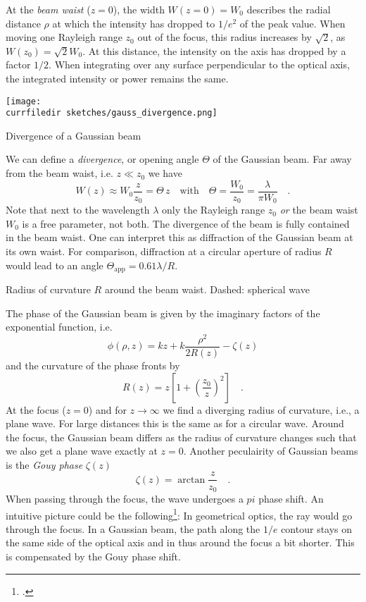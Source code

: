 At the \emph{beam waist} ($z=0$), the width $W(z=0) = W_0$ describes the radial distance $\rho$ at which the intensity  has dropped to $1/e^2$ of the peak value. When moving one Rayleigh range $z_0$ out of the focus, this radius increases by $\sqrt{2}$, as $W(z_0) = \sqrt{2} W_0$. At this distance, the intensity on the axis has dropped by a factor $1/2$. When integrating over any surface perpendicular to the optical axis, the integrated intensity or power remains the same.

\begin{marginfigure}
    \texttt{[image: \\currfiledir sketches/gauss\_divergence.png]}
   \caption{Divergence of a Gaussian beam}
\end{marginfigure}


We can define a \emph{divergence}, or opening angle $\Theta$ of the Gaussian beam. Far away from the beam waist, i.e. $z \ll z_0$ we have
\begin{equation}
    W(z) \approx W_0 \frac{z}{z_0} = \Theta \, z \quad \text{with} \quad \Theta = \frac{W_0}{z_0} = \frac{\lambda}{\pi W_0} \quad .
 \end{equation}
 Note that next to the wavelength $\lambda$ only the Rayleigh range $z_0$ \emph{or} the beam waist $W_0$ is a free parameter, not both. The divergence of the beam is fully contained in the beam waist. One can interpret this as diffraction of the Gaussian beam at its own waist. For comparison, diffraction at a circular aperture of radius $R$ would  lead to an angle $\Theta_\text{app} = 0.61 \lambda  / R$.


\begin{marginfigure}
   \caption{Radius of curvature $R$ around the beam waist. Dashed: spherical wave}
\end{marginfigure}


The phase of the Gaussian beam is given by the imaginary factors of the exponential function, i.e.
\begin{equation}
    \phi(\rho, z) = k z + k  \frac{\rho^2}{2 R(z)}  -  \zeta(z) 
\end{equation}
and the curvature of the phase fronts by 
\begin{equation}
    R(z) = z \left[ 1 + \left( \frac{z_0}{z} \right)^2 \right]  \quad .
\end{equation}
At the focus ($z=0$) and for $z \rightarrow \infty$ we find a diverging radius of curvature, i.e., a plane wave. For large distances this is the same as for a circular wave. Around the focus, the Gaussian beam differs as the radius of curvature changes such that we also get a plane wave exactly at $z=0$. Another peculairity of Gaussian beams is the \emph{Gouy phase} $\zeta(z)$
\begin{equation}
    \zeta(z) =  \arctan \frac{z}{z_0}  \quad .
\end{equation}
When passing through the focus, the wave undergoes a $pi$ phase shift. An intuitive picture could be the following\footcite{Boyd1980IntuitiveEO}: In geometrical optics, the ray would go through the focus. In a Gaussian beam, the path along the $1/e$ contour stays on the same side of the optical axis and in thus around the focus a bit shorter. This is compensated by the Gouy phase shift.

